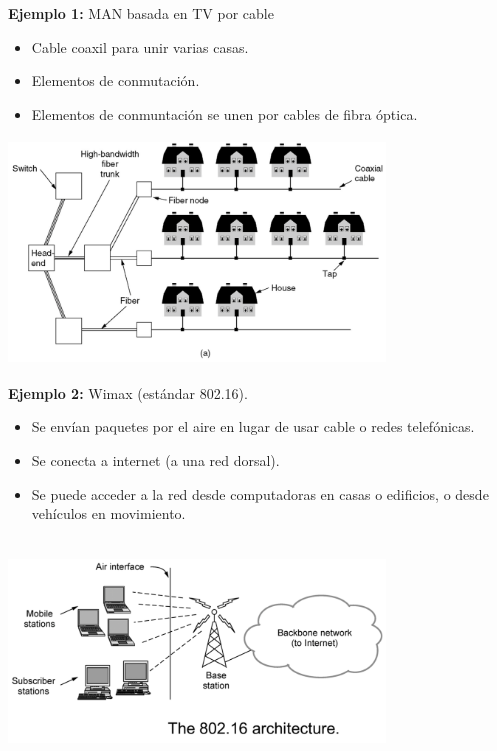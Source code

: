 \documentclass[10pt,a4paper]{report}
\begin{document}
\textbf{Ejemplo 1:} MAN basada en TV por cable
	\begin{itemize}
		\item Cable coaxil para unir varias casas.
		\item Elementos de conmutación.
		\item Elementos de conmuntación se unen por cables de fibra óptica.
	\end{itemize}
	
	\begin{center}
		\includegraphics[width=10cm, height=6cm]{./imagenes/metropolitana1.png} 
	\end{center}

\textbf{Ejemplo 2:} Wimax (estándar 802.16).
	\begin{itemize}
		\item Se envían paquetes por el aire en lugar de usar cable o redes telefónicas.
		\item Se conecta a internet (a una red dorsal).
		\item Se puede acceder a la red desde computadoras en casas o edificios, o 
		desde vehículos en movimiento.
	\end{itemize}	 
	
	\begin{center}
		\includegraphics[width=10cm, height=6cm]{./imagenes/metropolitana2.png} 
	\end{center}
\end{document}
